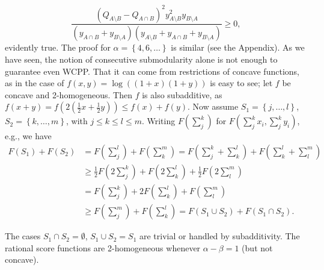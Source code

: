 \documentclass{article}
\theoremstyle{case}
\begin{document}
\[
\frac{(Q_{A\setminus B} - Q_{A\cap B})^2y_{A\setminus B}^2y_{B\setminus A}}{(y_{A\cap B}+y_{B\setminus A})(y_{A\setminus B}+y_{A\cap B}+y_{B\setminus A})} \geq 0,
\]
evidently true. The proof for $\alpha = \left\lbrace 4, 6, \dots \right\rbrace$ is similar (see the Appendix). As we have seen, the notion of consecutive submodularity alone is not enough to guarantee even WCPP. That it can come from restrictions of concave functions, as in the case of $f(x,y) = \log{((1+x)(1+y))}$ is easy to see; let $f$ be concave and 2-homogeneous. Then $f$ is also subadditive, as $f(x+y) = f(2(\frac{1}{2}x + \frac{1}{2}y)) \leq f(x)+f(y)$. Now assume $S_1 = \left\lbrace j, \dots, l\right\rbrace$, $S_2 = \left\lbrace k, \dots, m\right\rbrace$, with $j \leq k \leq l \leq m$. Writing $F(\sum_j^k)$ for $F(\sum_j^kx_i, \sum_j^ky_i)$, e.g., we have
\begin{align*}
F(S_1)+F(S_2) &= F(\sum_j^l)+F(\sum_k^m) = F(\sum_j^k+\sum_k^l)+F(\sum_k^l+\sum_l^m) \\
&\geq \frac{1}{2}F(2\sum_j^k)+F(2\sum_k^l)+\frac{1}{2}F(2\sum_l^m) \\
&=F(\sum_j^k)+2F(\sum_k^l)+F(\sum_l^m) \\
&\geq F(\sum_j^m)+F(\sum_k^l) = F(S_1\cup S_2)+F(S_1\cap S_2).
\end{align*} 

The cases $S_1 \cap S_2 = \emptyset$, $S_1 \cup S_2 = S_1$ are trivial or handled by subadditivity. The rational score functions are 2-homogeneous whenever $\alpha - \beta = 1$ (but not concave). 
\end{document}
